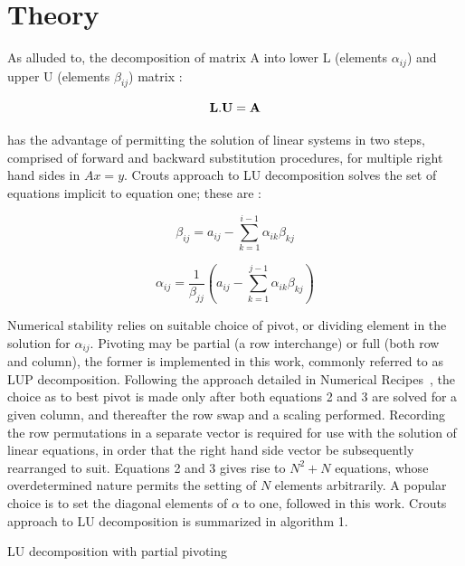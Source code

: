 \documentclass[letter, 12pt]{article}
\newcommand{\beq}{\begin{center}\begin{equation}}
\newcommand{\eeq}{\end{equation}\end{center}}
\begin{document}
\section{Theory}   
As alluded to, the decomposition of matrix A into lower L (elements $\alpha_{ij}$) and upper U (elements $\beta_{ij}$) matrix :
\beq {\bf L.U} = {\bf A} \eeq
has the advantage of permitting the solution of linear systems in two steps, comprised of forward and backward substitution procedures, for multiple right hand sides in $Ax=y$. Crouts approach to LU decomposition solves the set of equations implicit to equation one; these are :
\beq \beta_{ij} = a_{ij} - \sum_{k=1}^{i-1} \alpha_{ik}\beta_{kj} \eeq
\beq \alpha_{ij} = \frac{1}{\beta_{jj}}\left( a_{ij} - \sum_{k=1}^{j-1} \alpha_{ik} \beta_{kj} \right ) \eeq
Numerical stability relies on suitable choice of pivot, or dividing element in the solution for $\alpha_{ij}$. Pivoting may be partial (a row interchange) or full (both row and column), the former is implemented in this work, commonly referred to as LUP decomposition. Following the approach detailed in Numerical Recipes~\cite{num}, the choice as to best pivot is made only after both equations 2 and 3 are solved for a given column, and thereafter the row swap and a scaling performed. Recording the row permutations in a separate vector is required for use with the solution of linear equations, in order that the right hand side vector be subsequently rearranged to suit. Equations 2 and 3 gives rise to $N^2 + N$ equations, whose overdetermined nature permits the setting of $N$ elements arbitrarily. A popular choice is to set the diagonal elements of $\alpha$ to one, followed in this work. Crouts approach to LU decomposition is summarized in algorithm 1.

\begin{algorithm}[t!]
\linesnumbered
{}

 \caption{LU decomposition with partial pivoting}
\end{algorithm}
\end{document}
